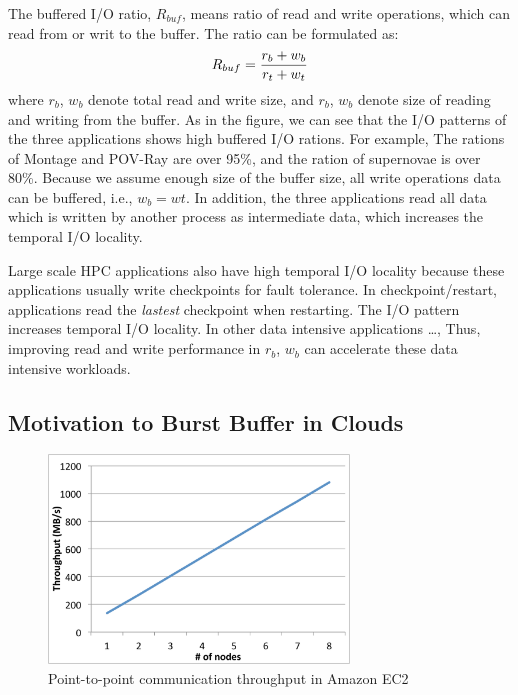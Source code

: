 The buffered I/O ratio, $R_{buf}$, means
ratio of read and write operations, which can read from or writ to the buffer.
The ratio can be formulated as:
\begin{equation}
R_{buf} = \frac{r_{b} + w_{b}}{r_{t} + w_{t}} \\
\end{equation}
where $r_{b}$, $w_{b}$ denote total read and write size, and $r_{b}$, $w_{b}$
denote size of reading and writing from the buffer. 
As in the figure, we can see that the I/O patterns of the three applications
shows high buffered I/O rations. For example, The rations of Montage and POV-Ray
are over 95\%, and the ration of supernovae is over 80\%.
Because we assume enough size of the buffer size, all write operations data can
be buffered, i.e., $w_{b} = w{t}$.
 In addition, the three applications
read all data which is written by another process as intermediate data, which
increases the temporal I/O locality.
\par
 Large scale HPC applications also have high temporal I/O
locality because these applications usually write checkpoints for fault
tolerance. 
In checkpoint/restart, applications read the \emph{lastest} checkpoint when
restarting. The I/O pattern increases temporal I/O locality. 
In other data intensive applications \ldots, 
Thus, improving read and write performance in $r_{b}$, $w_{b}$ can accelerate
these data intensive workloads.



\subsection{Motivation to Burst Buffer in Clouds}
\label{ssec:network_s3}

\begin{figure}
\centering
\includegraphics[width=8cm]{img/point_to_point}
\caption{Point-to-point communication throughput in Amazon EC2}
\label{background:Amazon point to point throughput}
\end{figure}


